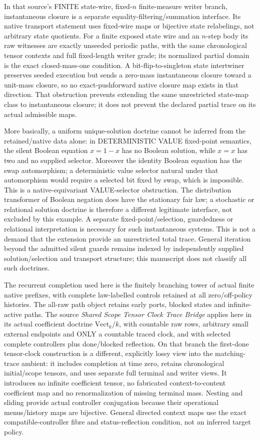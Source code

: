 \documentclass[11pt]{article}
\begin{document}
In that source's FINITE state-wire, fixed-$n$ finite-measure writer branch, instantaneous closure is a separate equality-filtering/summation interface. Its native transport statement uses fixed-wire maps or bijective state relabelings, not arbitrary state quotients. For a finite exposed state wire and an $n$-step body its raw witnesses are exactly unseeded periodic paths, with the same chronological tensor contexts and full fixed-length writer grade; its normalized partial domain is the exact closed-mass-one condition. A bit-flip-to-singleton state intertwiner preserves seeded execution but sends a zero-mass instantaneous closure toward a unit-mass closure, so no exact-pushforward native closure map exists in that direction. That obstruction prevents extending the same unrestricted state-map class to instantaneous closure; it does not prevent the declared partial trace on its actual admissible maps.

More basically, a uniform unique-solution doctrine cannot be inferred from the retained/native data alone: in DETERMINISTIC VALUE fixed-point semantics, the silent Boolean equation $x=1-x$ has no Boolean solution, while $x=x$ has two and no supplied selector. Moreover the identity Boolean equation has the swap automorphism; a deterministic value selector natural under that automorphism would require a selected bit fixed by swap, which is impossible. This is a native-equivariant VALUE-selector obstruction. The distribution transformer of Boolean negation does have the stationary fair law; a stochastic or relational solution doctrine is therefore a different legitimate interface, not excluded by this example. A separate fixed-point/selection, guardedness or relational interpretation is necessary for such instantaneous systems. This is not a demand that the extension provide an unrestricted total trace. General iteration beyond the admitted silent guards remains indexed by independently supplied solution/selection and transport structure; this manuscript does not classify all such doctrines.

The recurrent completion used here is the finitely branching tower of actual finite native prefixes, with complete law-labelled controls retained at all zero/off-policy histories. The all-raw path object retains early ports, blocked states and infinite-active paths. The source \emph{Shared Scope Tensor Clock Trace Bridge} applies here in its actual coefficient doctrine $\mathrm{Vect}_k/k$, with countable raw rows, arbitrary small external endpoints and ONLY a countable traced clock, and with selected complete controllers plus done/blocked reflection. On that branch the first-done tensor-clock construction is a different, explicitly lossy view into the matching-trace ambient: it includes completion at time zero, retains chronological initial/scope tensors, and uses separate full terminal and writer views. It introduces no infinite coefficient tensor, no fabricated context-to-content coefficient map and no renormalization of missing terminal mass. Nesting and sliding provide actual controller conjugation because their operational menus/history maps are bijective. General directed context maps use the exact compatible-controller fibre and status-reflection condition, not an inferred target policy.
\end{document}

